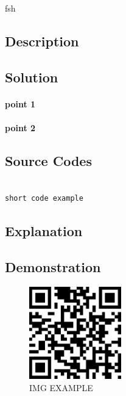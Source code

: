 \documentclass{book}
\begin{document}
fsh

\subsection{Description}

\subsection{Solution}

\paragraph{point 1}

\paragraph{point 2}

\subsection{Source Codes}

\begin{minipage}[r]{15em}
\begin{verbatim}

short code example

\end{verbatim}
\end{minipage}

\subsection{Explanation}

\subsection{Demonstration}

\begin{figure}[H]
\centering
\includegraphics[height=4.0cm,width=4.0cm]{img/fsh_1.jpg}
\caption{IMG EXAMPLE}
\end{figure}
\end{document}
